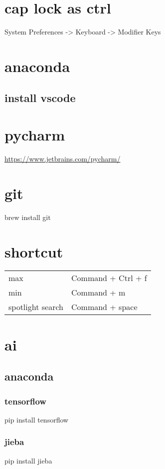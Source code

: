 \documentclass[11pt]{article}
\begin{document}
\section{cap lock as ctrl}
\label{sec:org2701398}
System Preferences -> Keyboard -> Modifier Keys\\

\section{anaconda}
\label{sec:orgd48b589}
\subsection{install vscode}
\label{sec:org2cdc052}

\section{pycharm}
\label{sec:orgbe816c0}
\url{https://www.jetbrains.com/pycharm/}\\




\section{git}
\label{sec:orgb49baa9}
brew install git\\



\section{shortcut}
\label{sec:orgd9f8816}
\begin{center}
\begin{tabular}{ll}
max & Command + Ctrl + f\\
min & Command + m\\
spotlight search & Command + space\\
\end{tabular}
\end{center}


\section{ai}
\label{sec:org1b647d6}
\subsection{anaconda}
\label{sec:org7290555}
\subsubsection{tensorflow}
\label{sec:orgb605ac9}
pip install tensorflow\\
\subsubsection{jieba}
\label{sec:orge83add1}
pip install jieba\\
\end{document}
